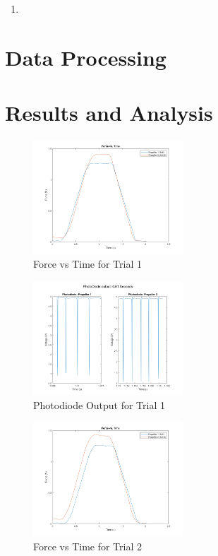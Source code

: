 \documentclass{article}
\begin{document}
%
\begin{enumerate}
  \item 
\end{enumerate}

\section{Data Processing}

\section{Results and Analysis}

\begin{figure}[H]
  \centering
  \includegraphics[width = 0.5\textwidth]{finalprojectimages/Trial1_ForcevTime.png}
  \caption{Force vs Time for Trial 1}
  \label{fig:forcevtime}
\end{figure}

\begin{figure}[H]
  \centering
  \includegraphics[width = 0.5\textwidth]{finalprojectimages/Trial1_PhotoDiode.png}
  \caption{Photodiode Output for Trial 1}
  \label{fig:photodiode}
\end{figure}

\begin{figure}[H]
  \centering
  \includegraphics[width = 0.5\textwidth]{finalprojectimages/Trial2_ForcevTime.png}
  \caption{Force vs Time for Trial 2}
  \label{fig:forcevtime2}
\end{figure}
\end{document}
